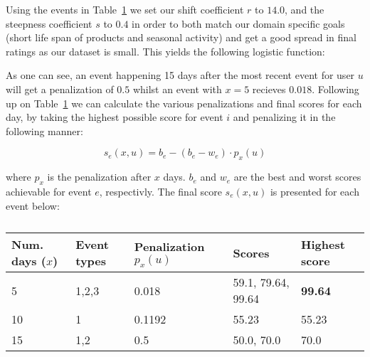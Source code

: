 Using the events in Table~\ref{events-example} we set our shift coefficient $r$
to $14.0$, and the steepness coefficient $s$ to $0.4$ in order to both match
our domain specific goals (short life span of products and seasonal activity)
and get a good spread in final ratings as our dataset is small. This yields the
following logistic function:

\begin{figure}[h!]
  \centering
\end{figure}

As one can see, an event happening 15 days after the most recent event for user
$u$ will get a penalization of $0.5$ whilst an event with $x=5$ recieves
$0.018$. Following up on Table~\ref{events-example} we can calculate the
various penalizations and final scores for each day, by taking the highest
possible score for event $i$ and penalizing it in the following manner:

\begin{equation}
  s_{e}(x,u) = b_e - (b_e - w_e) \cdot p_{x}(u)
\end{equation}

where $p_x$ is the penalization after $x$ days. $b_e$ and $w_e$ are the best
and worst scores achievable for event $e$, respectivly. The final score
$s_{e}(x,u)$ is presented for each event below:

\begin{table}[H]
  \centering
  \begin{tabular}{llm{2cm}ll}
    \toprule
    Num. days ($x$) & Event types & Penalization $p_{x}(u)$ & Scores & Highest score \\
    \midrule
    5   & 1,2,3 & 0.018   & 59.1, 79.64, 99.64 & \textbf{99.64} \\
    10  & 1     & 0.1192  & 55.23              & 55.23  \\
    15  & 1,2   & 0.5     & 50.0, 70.0         & 70.0 \\
    \bottomrule
  \end{tabular}
  \caption[]{}
  \label{events-example}
\end{table}

